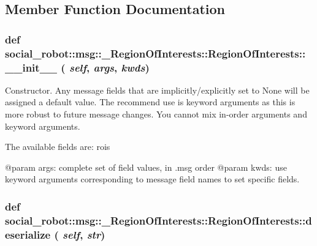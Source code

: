 \subsection{Member Function Documentation}
\hypertarget{classsocial__robot_1_1msg_1_1__RegionOfInterests_1_1RegionOfInterests_a2db171c12bf93b29f41111a5ff1c2fc8}{
\subsubsection[{\_\-\_\-init\_\-\_\-}]{\setlength{\rightskip}{0pt plus 5cm}def social\_\-robot::msg::\_\-RegionOfInterests::RegionOfInterests::\_\-\_\-init\_\-\_\- ( {\em self}, \/   {\em args}, \/   {\em kwds})}}
\label{classsocial__robot_1_1msg_1_1__RegionOfInterests_1_1RegionOfInterests_a2db171c12bf93b29f41111a5ff1c2fc8}
\begin{DoxyVerb}
Constructor. Any message fields that are implicitly/explicitly
set to None will be assigned a default value. The recommend
use is keyword arguments as this is more robust to future message
changes.  You cannot mix in-order arguments and keyword arguments.

The available fields are:
   rois

@param args: complete set of field values, in .msg order
@param kwds: use keyword arguments corresponding to message field names
to set specific fields. 
\end{DoxyVerb}
 \hypertarget{classsocial__robot_1_1msg_1_1__RegionOfInterests_1_1RegionOfInterests_a5991036e5324683608a95d0ffad57a0c}{
\subsubsection[{deserialize}]{\setlength{\rightskip}{0pt plus 5cm}def social\_\-robot::msg::\_\-RegionOfInterests::RegionOfInterests::deserialize ( {\em self}, \/   {\em str})}}
\label{classsocial__robot_1_1msg_1_1__RegionOfInterests_1_1RegionOfInterests_a5991036e5324683608a95d0ffad57a0c}
